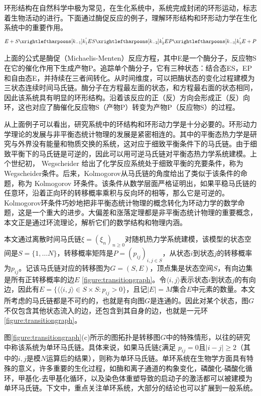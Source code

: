 

环形结构在自然科学中极为常见，在生化系统中，系统完成封闭的环形运动，标志着生物活动的进行。下面通过酶促反应的例子，理解环形结构和环形动力学在生化系统中的重要作用。
\begin{equation*}
    E + S \xrightleftharpoons[k_{-1}]{k^{'}_1}
    ES \xrightleftharpoons[k_{-2}]{k^{'}_2}
    EP \xrightleftharpoons[k_{-3}]{k^{'}_3}
    E + P
\end{equation*}

上面的公式是酶促（Michaelis-Menten）反应方程，其中E是一个酶分子，反应物S在它的催化作用下生成产物P。追踪单个酶分子，它有三种状态：结合态ES，EP和自由态E，并持续在三者间转化。从时间维度，可以把酶状态的变化过程建模为三状态连续时间马氏链。酶分子在方程最左面的状态，和方程最右面的状态相同，因此该系统具有明显的环形结构。沿着该反应的正（反）方向会形成正（反）向环，这也对应了酶催化反应物S（产物P）转变为产物P（反应物S）的过程。

从上面例子可以看出，研究系统中的环结构和环形动力学是十分必要的。环形动力学理论的发展与非平衡态统计物理的发展是紧密相连的。其中的平衡态热力学是研究与外界没有能量和物质交换的系统，这对应于细致平衡条件下的马氏链。由于细致平衡下的马氏链是可逆的，因此可以用可逆马氏链对平衡态热力学系统建模。上个世纪初， Wegscheider 给出了化学反应系统处于细致平衡的充要条件，称为Wegscheider条件。后来，Kolmogorov从马氏链的角度给出了类似于该条件的命题，称为 Kolmogorov 环条件。该条件从数学层面严格证明出，如果平稳马氏链的任意环，沿着正向环的转移概率乘积与反向环的相等，那么它是可逆的。Kolmogorov环条件巧妙地把非平衡态统计物理的概念转化为环动力学的数学命题，这是一个重大的进步。大偏差和涨落定理都是非平衡态统计物理的重要概念，本文正是通过环流理论，解析它们的数学结构和物理内涵。

本文通过离散时间马氏链$\xi = (\xi_n)_{n \ge 0}$对随机热力学系统建模，该模型的状态空间是$S = \{1, \dots N\}$，转移概率矩阵是$P=(p_{ij})_{i,j \in S}$，从状态$i$到状态$j$的转移概率为$p_{ij}$。记该马氏链对应的转移图为$G=(S, E)$，顶点集是状态空间$S$，有向边集是所有正转移概率的边$E$ \ref{figure:transitiongraph}。令$\langle i, j\rangle$表示状态$i$到状态$j$的有向边，因此有$E = \{\langle \langle i, j\rangle \in S \times S: p_{ij}>0\}$，且记$|E| = M$集合$E$中元素的数量。本文所考虑的马氏链都是不可约的，也就是有向图$G$是连通的。因此对某个状态，图$G$不仅包含其他状态流入的边，还包含到其自身的边，也就是一元环 \ref{figure:transitiongraph}。

图\ref{figure:transitiongraph}(c)所示的图拓扑是转移图$G$中的特殊情形，以往的研究中称该系统为单环马氏链。具体来说，如果马氏链$\xi$满足 $p_{ij}=0$且$|i-j| \ge 2$（其中的$i,j$是模$N$运算后的结果），则称为单环马氏链。单环系统在生物学方面具有特殊的意义，许多重要的生化过程，如酶和离子通道的构象变化\cite{cornish2013fundamentals,sakmann2013single}，磷酸化-磷酸化循环\cite{beard2008chemical}，甲基化-去甲基化循环\cite{jia2017nonequilibrium}，以及染色体重塑导致的启动子的激活\cite{pedraza2008effects,jia2022analytical}都可以被建模为单环马氏链。下文中，重点关注单环系统，大部分的结论也可以扩展到一般系统。

